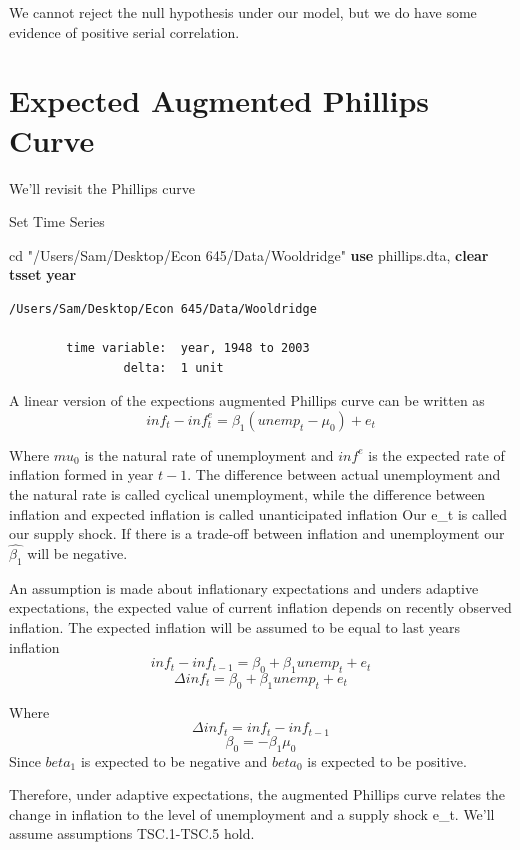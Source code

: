 \documentclass[
]{book}
\newenvironment{Shaded}{\begin{snugshade}}{\end{snugshade}}
\newcommand{\FunctionTok}[1]{\textcolor[rgb]{0.13,0.29,0.53}{\textbf{#1}}}
\newcommand{\KeywordTok}[1]{\textcolor[rgb]{0.13,0.29,0.53}{\textbf{#1}}}
\newcommand{\NormalTok}[1]{#1}
\newcommand{\StringTok}[1]{\textcolor[rgb]{0.31,0.60,0.02}{#1}}
\begin{document}
We cannot reject the null hypothesis under our model, but we do have some
evidence of positive serial correlation.

\section{Expected Augmented Phillips Curve}\label{expected-augmented-phillips-curve}

We'll revisit the Phillips curve

Set Time Series

\begin{Shaded}
\begin{Highlighting}[]
\NormalTok{cd }\StringTok{"/Users/Sam/Desktop/Econ 645/Data/Wooldridge"}    
\KeywordTok{use}\NormalTok{ phillips.dta, }\KeywordTok{clear}
\KeywordTok{tsset} \FunctionTok{year}
\end{Highlighting}
\end{Shaded}

\begin{verbatim}
/Users/Sam/Desktop/Econ 645/Data/Wooldridge

        time variable:  year, 1948 to 2003
                delta:  1 unit
\end{verbatim}

A linear version of the expections augmented Phillips curve can be written as
\[ inf_t - inf^e_t=\beta_1(unemp_t-\mu_0) + e_t \]

Where \(mu_0\) is the natural rate of unemployment and \(inf^e\) is the expected rate
of inflation formed in year \(t-1\).
The difference between actual unemployment and the natural rate is called
cyclical unemployment, while the difference between inflation and expected
inflation is called unanticipated inflation
Our e\_t is called our supply shock.
If there is a trade-off between inflation and unemployment our \(\hat{\beta_1}\)
will be negative.

An assumption is made about inflationary expectations and unders adaptive expectations,
the expected value of current inflation depends on recently observed inflation.
The expected inflation will be assumed to be equal to last years inflation
\[ inf_t - inf_{t-1}=\beta_0 + \beta_1 unemp_t + e_t \]
\[ \Delta inf_t =\beta_0 + \beta_1 unemp_t + e_t \]

Where
\[ \Delta inf_t=inf_t - inf_{t-1} \]
\[ \beta_0 = -\beta_1 \mu_0 \]
Since \(beta_1\) is expected to be negative and \(beta_0\) is expected to be positive.

Therefore, under adaptive expectations, the augmented Phillips curve relates the
change in inflation to the level of unemployment and a supply shock e\_t.
We'll assume assumptions TSC.1-TSC.5 hold.
\end{document}
